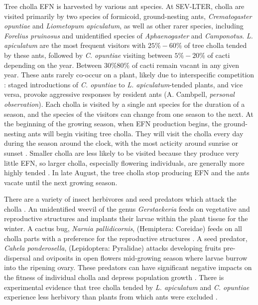 \documentclass[11pt]{article}
\begin{document}
Tree cholla EFN is harvested by various ant species. 
At SEV-LTER, cholla are visited primarily by two species of formicoid, ground-nesting ants, \textit{Crematogaster opuntiae} and \textit{Liometopum apiculatum}, as well as other rarer species, including \textit{Forelius pruinosus} and unidentified species of \textit{Aphaenogaster} and \textit{Camponotus}.
\textit{L. apiculatum} are the most frequent visitors with $25\% - 60\%$ of tree cholla tended by these ants, followed by \textit{C. opuntiae} visiting between $5\% - 20\%$ of cacti \citep{Donald2022} depending on the year. Between $ 30\% 80\%$ of cacti remain vacant in any given year. 
These ants rarely co-occur on a plant, likely due to interspecific competition \citep{Miller2007}: staged introductions of \textit{C. opuntiae} to \textit{L. apiculatum}-tended plants, and vice versa, provoke aggressive responses by resident ants (A. Cambpell, \textit{personal observation}).
Each cholla is visited by a single ant species for the duration of a season, and the species of the visitors can change from one season to the next. 
At the beginning of the growing season, when EFN production begins, the ground-nesting ants will begin visiting tree cholla.
They will visit the cholla every day during the season around the clock, with the most acticity around sunrise or sunset \citep{Ohm2014}. 
Smaller cholla are less likely to be visited because they produce very little EFN, so larger cholla, especially flowering individuals, are generally more highly tended \citep{Miller2014}. 
In late August, the tree cholla stop producing EFN and the ants vacate until the next growing season. 

There are a variety of insect herbivores and seed predators which attack the cholla \citep{Mann1969}. 
An unidentified weevil of the genus \textit{Gerstaekeria} feeds on vegetative and reproductive structures and implants their larvae within the plant tissue for the winter. 
A cactus bug, \textit{Narnia pallidicornis}, (Hemiptera: Coreidae) feeds on all cholla parts with a preference for the reproductive structures \citep{Miller2006}.
A seed predator, \textit{Cahela ponderosella}, (Lepidoptera: Pyralidae) attacks developing fruits pre-dispersal and oviposits in open flowers mid-growing season where larvae burrow into the ripening ovary. 
These predators can have significant negative impacts on the fitness of individual cholla and depress population growth \citep{Miller2009}.
There is experimental evidence that tree cholla tended by \textit{L. apiculatum} and \textit{C. opuntiae} experience less herbivory than plants from which ants were excluded \citep{Miller2007}. 
\end{document}
